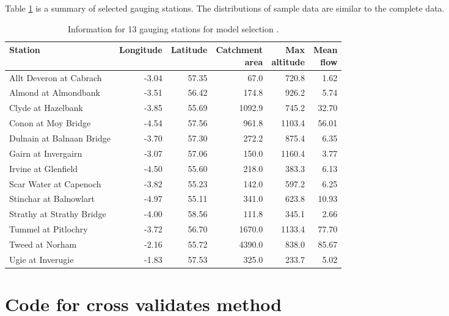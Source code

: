 \documentclass[12pt,oneside]{reedthesis}
\begin{document}
Table \ref{tab:information} is a summary of selected gauging stations. The distributions of sample data are similar to the complete data.
\begin{table}[!h]

\caption{\label{tab:unnamed-chunk-18}\label{tab:information} Information for 13 gauging stations for model selection .}
\centering
\fontsize{10}{12}\selectfont
\begin{tabular}[t]{lrrrrr}
\toprule
Station & Longitude & Latitude & \makecell[c]{Catchment\\area} & \makecell[c]{Max\\altitude} & \makecell[c]{Mean\\flow}\\
\midrule
Allt Deveron at Cabrach & -3.04 & 57.35 & 67.0 & 720.8 & 1.62\\
Almond at Almondbank & -3.51 & 56.42 & 174.8 & 926.2 & 5.74\\
Clyde at Hazelbank & -3.85 & 55.69 & 1092.9 & 745.2 & 32.70\\
Conon at Moy Bridge & -4.54 & 57.56 & 961.8 & 1103.4 & 56.01\\
Dulnain at Balnaan Bridge & -3.70 & 57.30 & 272.2 & 875.4 & 6.35\\
\addlinespace
Gairn at Invergairn & -3.07 & 57.06 & 150.0 & 1160.4 & 3.77\\
Irvine at Glenfield & -4.50 & 55.60 & 218.0 & 383.3 & 6.13\\
Scar Water at Capenoch & -3.82 & 55.23 & 142.0 & 597.2 & 6.25\\
Stinchar at Balnowlart & -4.97 & 55.11 & 341.0 & 623.8 & 10.93\\
Strathy at Strathy Bridge & -4.00 & 58.56 & 111.8 & 345.1 & 2.66\\
\addlinespace
Tummel at Pitlochry & -3.72 & 56.70 & 1670.0 & 1133.4 & 77.70\\
Tweed at Norham & -2.16 & 55.72 & 4390.0 & 838.0 & 85.67\\
Ugie at Inverugie & -1.83 & 57.53 & 325.0 & 233.7 & 5.02\\
\bottomrule
\end{tabular}
\end{table}
\hypertarget{code}{%
\chapter{Code for cross validates method}\label{code}}
\end{document}
